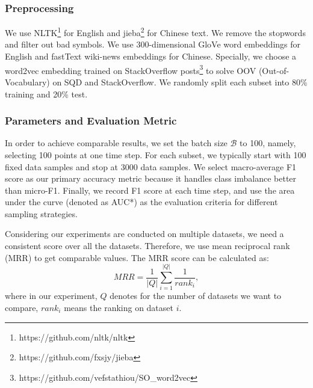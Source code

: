 






\subsubsection{Preprocessing}
We use NLTK\footnote{https://github.com/nltk/nltk} for English and jieba\footnote{https://github.com/fxsjy/jieba} for Chinese text.
We remove the stopwords and filter out bad symbols. 
We use 300-dimensional GloVe word embeddings \cite{pennington2014glove} 
for English and fastText wiki-news embeddings \cite{mikolov2018advances} for Chinese. 
Specially, we choose a word2vec embedding trained on StackOverflow posts\footnote{https://github.com/vefstathiou/SO\_word2vec}  to solve OOV (Out-of-Vocabulary) on SQD and StackOverflow. We randomly split each subset into 80\% training and 20\% test. 

\subsubsection{Parameters and Evaluation Metric}
In order to achieve comparable results, we set the batch size $\mathcal{B}$ to 100, namely, selecting 100 points at one time step. For each subset, we typically start with 100 fixed data samples and stop at 3000 data samples. 
We select macro-average F1 score as our primary accuracy metric because it handles
class imbalance better than micro-F1. Finally, we record F1 score at each time step, 
and use the area under the curve (denoted as AUC*) as the evaluation criteria for different
sampling strategies. 

Considering our experiments are conducted on multiple datasets, we need a consistent score over all the datasets. Therefore, we use mean reciprocal rank (MRR) to get comparable values. The MRR score can be calculated as:
$$MRR = \frac{1}{|Q|}\sum_{i=1}^{|Q|}\frac{1}{rank_i},$$
where in our experiment, $Q$ denotes for the number of datasets we want to compare, $rank_i$ means the ranking on dataset $i$.


